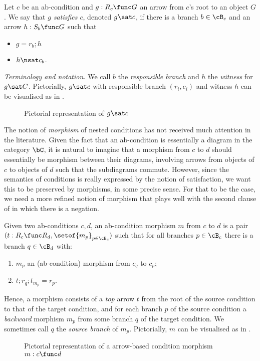 \begin{definition}
  Let $c$ be an ab-condition and $g:R_c\func G$ an arrow from $c$'s root to an object $G$. We say that \emph{$g$ satisfies $c$}, denoted $g\sat c$, if there is a branch $b\in \cB_c$ and an arrow $h:S_b\func G$ such that
  \begin{itemize}
  \item $g=r_b;h$
  \item $h\nsat c_b$.
  \end{itemize}
\end{definition}
%
\emph{Terminology and notation.} We call $b$ the \emph{responsible branch} and $h$ the \emph{witness} for $g\sat C$. Pictorially, $g\sat c$ with responsible branch $(r_i,c_i)$ and witness $h$ can be visualised as in .
%
\begin{figure}
  \centering
  
  \caption{Pictorial representation of $g\sat c$}
\end{figure}

\medskip\noindent The notion of \emph{morphism} of nested conditions has not received much attention in the literature. Given the fact that an ab-condition is essentially a diagram in the category $\bC$, it is natural to imagine that a morphism from $c$ to $d$ should essentially be morphism between their diagrams, involving arrows from objects of $c$ to objects of $d$ such that the subdiagrams commute. However, since the semantics of conditions is really expressed by the notion of satisfaction, we want this to be preserved by morphisms, in some precise sense. For that to be the case, we need a more refined notion of morphism that plays well with the second clause of  in which there is a negation.

\begin{definition}
  Given two ab-conditions $c,d$, an ab-condition morphism $m$ from $c$ to $d$ is a pair $(t:R_c\func R_d,\setof{m_p}_{p\in \cB_c})$ such that for all branches $p\in \cB_c$ there is a branch $q\in \cB_d$ with:
  \begin{enumerate}
  \item $m_p$ an (ab-condition) morphism from $c_q$ to $c_p$;
  \item $t;r_q;t_{m_p}=r_p$.
  \end{enumerate}
\end{definition}
%
Hence, a morphism consists of a \emph{top} arrow $t$ from the root of the source condition to that of the target condition, and for each branch $p$ of the source condition a \emph{backward} morphism $m_p$ from some branch $q$ of the target condition. We sometimes call $q$ the \emph{source branch} of $m_p$. Pictorially, $m$ can be visualised as in .
%
\begin{figure}
  \centering
  
  \caption{Pictorial representation of a arrow-based condition morphism $m:c\func d$}
\end{figure}

